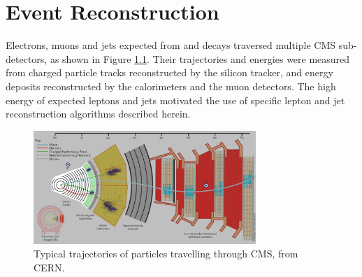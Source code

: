 \chapter{Event Reconstruction}
\label{sec:reco_chapter}

Electrons, muons and jets expected from \WR and \nul decays traversed multiple CMS sub-detectors, 
as shown in Figure \ref{fig:particleTrajectories}.  Their trajectories and energies were measured 
from charged particle tracks reconstructed by the silicon tracker, and energy deposits reconstructed 
by the calorimeters and the muon detectors.  The high energy of expected leptons and jets motivated 
the use of specific lepton and jet reconstruction algorithms described herein.

\begin{figure}[h]
	\centering
	\includegraphics[width=0.75\textwidth]{figures/flowOfParticlesThroughCMS.png}
	\caption{Typical trajectories of particles travelling through CMS, from CERN.}
	\label{fig:particleTrajectories}
\end{figure}


